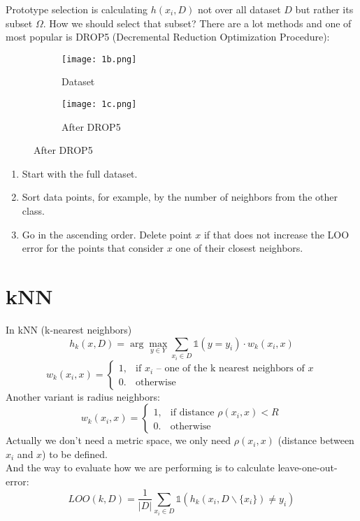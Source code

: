 Prototype selection is calculating $h(x_i, D)$ not over all dataset $D$ but rather its subset $\Omega$. How we should select that subset? There are a lot methods and one of most popular is DROP5 (Decremental Reduction Optimization Procedure):
\begin{figure}[H]
  \centering
  \begin{subfigure}[c]{0.3\linewidth}
    \texttt{[image: 1b.png]}
    \caption*{Dataset}
  \end{subfigure}
  \hspace{2cm}
  \begin{subfigure}[c]{0.3\linewidth}
    \texttt{[image: 1c.png]}
    \caption*{After DROP5}
  \end{subfigure}
\end{figure}
\begin{enumerate}
	\item Start with the full dataset.
	\item Sort data points, for example, by the number of neighbors from the other class.
	\item Go in the ascending order. Delete point $x$ if that does not increase the LOO error for the points that consider $x$ one of their closest neighbors.
\end{enumerate}

\section{kNN}

In kNN (k-nearest neighbors)
$$h_k(x, D)=\arg\max\limits_{y\in Y}\sum\limits_{x_i\in D}\mathbb{1}(y=y_i)\cdot w_k(x_i,x)$$
$$w_k(x_i,x)=\begin{cases}
	1, & \text{if $x_i$ -- one of the k nearest neighbors of $x$} \\
	0. & \text{otherwise}
\end{cases}
$$
Another variant is radius neighbors:
$$w_k(x_i,x)=\begin{cases}
	1, & \text{if distance $\rho(x_i,x)<R$} \\
	0. & \text{otherwise}
\end{cases}
$$
Actually we don't need a metric space, we only need $\rho(x_i, x)$ (distance between $x_i$ and $x$) to be defined. \\
And the way to evaluate how we are performing is to calculate leave-one-out-error:
$$LOO(k,D)=\frac{1}{|D|}\sum\limits_{x_i\in D}\mathbb{1}(h_k(x_i,D\backslash\{x_i\})\ne y_i)$$

